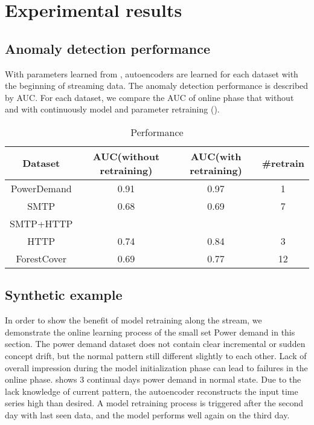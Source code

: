 \chapter{Experimental results}
\label{chap:results}


\section{Anomaly detection performance}
\label{sec:performance}

With parameters learned from , autoencoders are learned for each dataset with the beginning of streaming data. The anomaly detection performance is described by AUC. For each dataset, we compare the AUC of online phase that without and with continuously model and parameter retraining (). 

\begin{table}[h] 
\caption{Performance} 
\centering      
\begin{tabular}{c | c | c | c}  
\hline  
Dataset & AUC(without retraining) & AUC(with retraining) & \#retrain \\ 
\hline 
PowerDemand & 0.91 & 0.97 & 1  \\  
\hline 
SMTP & 0.68 & 0.69 & 7 \\ 
\hline 
SMTP+HTTP &  &  & \\ 
\hline 
HTTP & 0.74 &  0.84 &  3 \\ 
\hline 
ForestCover &0.69&0.77 & 12\\   
\hline    
\end{tabular}
\label{tab:performance}  
\end{table} 

\section{Synthetic example}
\label{sec:synthetic}

In order to show the benefit of model retraining along the stream, we demonstrate the online learning process of the small set Power demand in this section. The power demand dataset does not contain clear incremental or sudden concept drift, but the normal pattern still different slightly to each other. Lack of overall impression during the model initialization phase can lead to failures in the online phase.  shows 3 continual days power demand in normal state. Due to the lack knowledge of current pattern, the autoencoder reconstructs the input time series high than desired. A model retraining process is triggered after the second day with last seen data, and the model performs well again on the third day.

